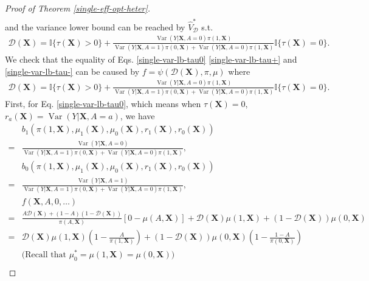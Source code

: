 \documentclass[11pt]{article}
\theoremstyle{referenceplain}
\theoremstyle{referencedefinition}
\theoremstyle{referenceremark}
\begin{document}
\begin{proof}[Proof of Theorem \ref{single-eff-opt-heter}]
\begin{align*}
\end{align*}
and the variance lower bound can be reached by $\widehat{V}_{\mathcal{D}}^*$ s.t. 
    \begin{align*}
        \mathcal{D}(\mathbf{X})=\mathbb{I}\{\tau(\mathbf{X})>0\}+  \frac{\operatorname{Var}(Y|\mathbf{X},A=0)\pi(1,\mathbf{X})}{\operatorname{Var}(Y|\mathbf{X},A=1)\pi(0,\mathbf{X})+\operatorname{Var}(Y|\mathbf{X},A=0)\pi(1,\mathbf{X})}\mathbb{I}\{\tau(\mathbf{X})=0\}.
    \end{align*}
We check that the equality of Eqs. \eqref{single-var-lb-tau0} \eqref{single-var-lb-tau+} and \eqref{single-var-lb-tau-} can be caused by $f=\psi(\mathcal{D}(\mathbf{X}),\pi,\mu)$ where
\begin{align*}
        \mathcal{D}(\mathbf{X})=\mathbb{I}\{\tau(\mathbf{X})>0\}+  \frac{\operatorname{Var}(Y|\mathbf{X},A=0)\pi(1,\mathbf{X})}{\operatorname{Var}(Y|\mathbf{X},A=1)\pi(0,\mathbf{X})+\operatorname{Var}(Y|\mathbf{X},A=0)\pi(1,\mathbf{X})}\mathbb{I}\{\tau(\mathbf{X})=0\}.
    \end{align*}
First, for Eq. \eqref{single-var-lb-tau0}, which means when $\tau(\mathbf{X})=0$, $r_a(\mathbf{X}) = \operatorname{Var}(Y|\mathbf{X},A=a)$, we have
\begin{align*}
      &b_1(\pi(1,\mathbf{X}),\mu_1(\mathbf{X}),\mu_0(\mathbf{X}),r_1(\mathbf{X}),r_0(\mathbf{X})) \\=&  \frac{\operatorname{Var}(Y|\mathbf{X},A=0)}{\operatorname{Var}(Y|\mathbf{X},A=1)\pi(0,\mathbf{X})+\operatorname{Var}(Y|\mathbf{X},A=0)\pi(1,\mathbf{X})},\\
        &b_0(\pi(1,\mathbf{X}),\mu_1(\mathbf{X}),\mu_0(\mathbf{X}),r_1(\mathbf{X}),r_0(\mathbf{X}))\\ = & \frac{\operatorname{Var}(Y|\mathbf{X},A=1)}{\operatorname{Var}(Y|\mathbf{X},A=1)\pi(0,\mathbf{X})+\operatorname{Var}(Y|\mathbf{X},A=0)\pi(1,\mathbf{X})},\\
        &f(\mathbf{X},A,0,\dots)\\
        =&\frac{A \mathcal{D}(\mathbf{X})+(1-A)(1-\mathcal{D}(\mathbf{X}))}{\pi(A,\mathbf{X})}[0-\mu(A,\mathbf{X})]+\mathcal{D}(\mathbf{X})\mu(1,\mathbf{X})+(1-\mathcal{D}(\mathbf{X}))\mu(0,\mathbf{X})\\
        =&\mathcal{D}(\mathbf{X})\mu(1,\mathbf{X})\left(1-\frac{A}{\pi(1,\mathbf{X})}\right)+(1-\mathcal{D}(\mathbf{X}))\mu(0,\mathbf{X})\left(1-\frac{1-A}{\pi(0,\mathbf{X})}\right)\\
        &\text{(Recall that $\mu_0^* = \mu(1,\mathbf{X}) = \mu(0,\mathbf{X})$)}\\

\end{align*}
\end{proof}
\end{document}
